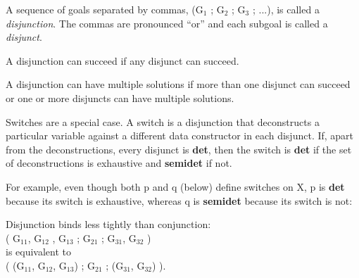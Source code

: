 \documentclass[a4paper,11pt,notitlepage,onecolumn]{book}
\begin{document}
A sequence of goals separated by commas, \textsf{(G$_{1}$ ; G$_{2}$ ; G$_{3}$ ; ...)}, is called a
\emph{disjunction}.  The commas are pronounced ``or'' and each subgoal is
called a \emph{disjunct}.

A disjunction can succeed if any disjunct can succeed.

A disjunction can have multiple solutions if more than one disjunct can
succeed or one or more disjuncts can have multiple solutions.

\Note Switches are a special case.  A switch is a disjunction that
deconstructs a particular variable against a different data constructor in
each disjunct.  If, apart from the deconstructions, every disjunct is \textsf{\textbf{det}},
then the switch is \textsf{\textbf{det}} if the set of deconstructions is exhaustive and
\textsf{\textbf{semidet}} if not.

For example, even though both \textsf{p} and \textsf{q} (below) define switches on \textsf{X},
\textsf{p} is \textsf{\textbf{det}} because its switch is exhaustive, whereas \textsf{q} is \textsf{\textbf{semidet}}
because its switch is not:
\begin{small}

\begin{ptabular}
\nextline
\nextline
{}
\nextline
{}
\nextline
\nextline
{}
\nextline
{}
\nextline
\end{ptabular}

\end{small}

\Note Disjunction binds less tightly than conjunction:
\\\textsf{( G$_{11}$, G$_{12}$ , G$_{13}$ ; G$_{21}$ ; G$_{31}$, G$_{32}$ )}
\\is equivalent to
\\\textsf{( (G$_{11}$, G$_{12}$, G$_{13}$) ; G$_{21}$ ; (G$_{31}$, G$_{32}$) )}.
\end{document}
